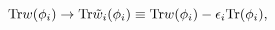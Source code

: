 \begin{equation}
{\rm {Tr}}w(\phi _{i})\rightarrow {\rm Tr}\tilde{w}_{i}(\phi
_{i})\equiv {\rm Tr} w(\phi_{i})-\epsilon_{i}{\rm Tr}(\phi_{i}),
\end{equation}

